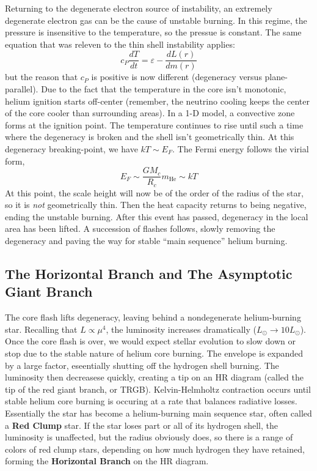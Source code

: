 \documentclass[10pt]{article}
\numberwithin{equation}{section}
\newcommand{\n}{\noindent}
\begin{document}
    \n Returning to the degenerate electron source of instability,
    an extremely degenerate electron gas can be the cause of unstable
    burning. In this regime, the pressure is insensitive to the
    temperature, so the pressue is constant. The same equation that
    was releven to the thin shell instability applies:
    \begin{equation}
      \label{eq:289}
      c_P\frac{dT}{dt}=\varepsilon-\frac{dL(r)}{dm(r)}
    \end{equation}
    but the reason that $c_P$ is positive is now different (degeneracy
    versus plane-parallel). Due to the fact that the temperature in
    the core isn't monotonic, helium ignition starts off-center
    (remember, the neutrino cooling keeps the center of the core
    cooler than surrounding areas). In a 1-D model, a convective zone
    forms at the ignition point. The temperature continues to rise
    until such a time where the degeneracy is broken and the shell
    isn't geometrically thin. At this degeneracy breaking-point, we
    have $kT\sim E_F$. The Fermi energy follows the virial form,
    \begin{equation}
      \label{eq:290}
      E_F\sim \frac{G M_c}{R_c}m_{\mathrm{He}}\sim kT
    \end{equation}
    At this point, the scale height will now be of the order of the
    radius of the star, so it is \emph{not} geometrically thin. Then
    the heat capacity returns to being negative, ending the unstable
    burning. After this event has passed, degeneracy in the local area
    has been lifted. A succession of flashes follows, slowly removing
    the degeneracy and paving the way for stable ``main sequence''
    helium burning.

    \subsection{The Horizontal Branch and The Asymptotic Giant Branch}
    \label{sec:horizontal-branch}

    The core flash lifts degeneracy, leaving behind a nondegenerate
    helium-burning star. Recalling that $L\propto \mu^4$, the
    luminosity increases dramatically ($L_\odot\to 10L_\odot$). Once
    the core flash is over, we would expect stellar evolution to slow
    down or stop due to the stable nature of helium core
    burning. The envelope is expanded by a large factor, eseentially
    shutting off the hydrogen shell burning. The luminosity then
    decreasese quickly, creating a tip on an HR diagram (called the
    tip of the red giant branch, or TRGB). Kelvin-Helmholtz
    contraction occurs until stable helium core burning is occuring at
    a rate that balances radiative losses. Essentially the star has
    become a helium-burning main sequence star, often called a
    \textbf{Red Clump} star. If the star loses part or all of its
    hydrogen shell, the luminosity is unaffected, but the radius
    obviously does, so there is a range of colors of red clump stars,
    depending on how much hydrogen they have retained, forming the
    \textbf{Horizontal Branch} on the HR diagram.\\
\end{document}
